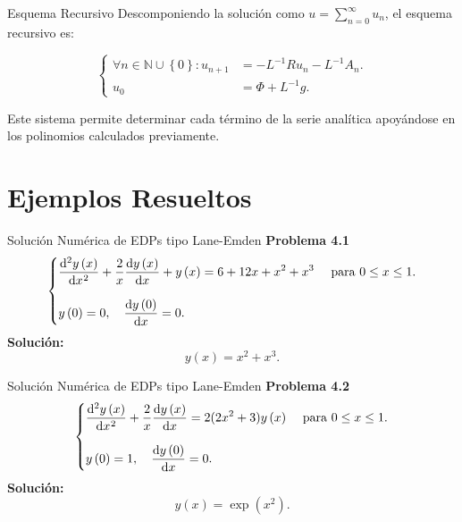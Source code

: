 \documentclass[
    8pt,
    aspectratio=1610,
    c,
    spanish,
    handout,
    intlimits,
    leqno,
    professionalfonts,
    spanish,
    xcolor=svgnames,
]{beamer}
\begin{document}
\begin{frame}{Esquema Recursivo}
	Descomponiendo la solución como $u=\sum\limits_{n=0}^{\infty}u_{n}$, el esquema recursivo es:

	\vspace{0.5cm}
	\begin{equation}\label{eq:adm_system}
		\boxed{
			\left\{
			\begin{aligned}
				\forall n\in\mathbb{N}\cup\left\{0\right\}:
				u_{n+1} & = -L^{-1}Ru_{n}-L^{-1}A_{n}. \\
				u_{0}   & = \Phi+L^{-1}g.
			\end{aligned}
			\right.
		}
	\end{equation}
	\vspace{0.5cm}

	Este sistema permite determinar cada término de la serie analítica apoyándose en los polinomios calculados previamente.
\end{frame}

\section{Ejemplos Resueltos}

\begin{frame}{Solución Numérica de EDPs tipo Lane-Emden}
	\textbf{Problema 4.1}
	\begin{equation}
		\begin{cases}\displaystyle
			\diff[2]{y\left(x\right)}{x}+
			\frac{2}{x}
			\diff{y\left(x\right)}{x}+
			y\left(x\right)=
			6 + 12 x+ x^{2} + x^{3}
			 & \text { para }0 \leq x \leq 1. \\[0.5cm]
			\displaystyle
			y
			\left(0\right)=
			0,\quad
			\diff{y\left(0\right)}{x}=
			0.
			 &
		\end{cases}
	\end{equation}
	\textbf{Solución:}
	\begin{equation*}
		\boxed{y\left(x\right)=x^{2}+x^{3}.}
	\end{equation*}
\end{frame}

\begin{frame}{Solución Numérica de EDPs tipo Lane-Emden}
	\textbf{Problema 4.2}
	\begin{equation}
		\begin{cases}\displaystyle
			\diff[2]{y\left(x\right)}{x}+
			\frac{2}{x}
			\diff{y\left(x\right)}{x} =
			2 (2x^{2} + 3 )y\left(x\right)
			 & \text { para }0 \leq x \leq 1. \\[0.5cm]
			\displaystyle
			y
			\left(0\right)=
			1,\quad
			\diff{y\left(0\right)}{x}=
			0.
			 &
		\end{cases}
	\end{equation}
	\textbf{Solución:}
	\begin{equation*}
		\boxed{y\left(x\right)=\exp\left(x^{2}\right).}
	\end{equation*}
\end{frame}
\end{document}
